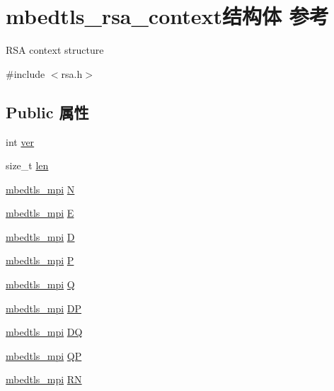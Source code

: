 \hypertarget{structmbedtls__rsa__context}{}\section{mbedtls\+\_\+rsa\+\_\+context结构体 参考}
\label{structmbedtls__rsa__context}


R\+SA context structure  




{\ttfamily \#include $<$rsa.\+h$>$}

\subsection*{Public 属性}
\begin{DoxyCompactItemize}
\item 
int \hyperlink{structmbedtls__rsa__context_a3b8683697a6f69c92860e078c934a4d9}{ver}
\item 
size\+\_\+t \hyperlink{structmbedtls__rsa__context_a06a537fe6045d6c08d92b2a91461b5d8}{len}
\item 
\hyperlink{structmbedtls__mpi}{mbedtls\+\_\+mpi} \hyperlink{structmbedtls__rsa__context_a359cae81bccf5cfd2f37f98d1b790707}{N}
\item 
\hyperlink{structmbedtls__mpi}{mbedtls\+\_\+mpi} \hyperlink{structmbedtls__rsa__context_a7694251c9d4d80f4fe65831be46b0c50}{E}
\item 
\hyperlink{structmbedtls__mpi}{mbedtls\+\_\+mpi} \hyperlink{structmbedtls__rsa__context_ad9552371239922dd67d146b937d1aada}{D}
\item 
\hyperlink{structmbedtls__mpi}{mbedtls\+\_\+mpi} \hyperlink{structmbedtls__rsa__context_abb8c0a5e2c22d617ff2fc3b2a81ab53c}{P}
\item 
\hyperlink{structmbedtls__mpi}{mbedtls\+\_\+mpi} \hyperlink{structmbedtls__rsa__context_a72efb64a1c63318ced5869e570c7cce3}{Q}
\item 
\hyperlink{structmbedtls__mpi}{mbedtls\+\_\+mpi} \hyperlink{structmbedtls__rsa__context_aa46b066a4cf04deb4e627e69e6b036e8}{DP}
\item 
\hyperlink{structmbedtls__mpi}{mbedtls\+\_\+mpi} \hyperlink{structmbedtls__rsa__context_a753b59e552469b6abb6fad9853a2042d}{DQ}
\item 
\hyperlink{structmbedtls__mpi}{mbedtls\+\_\+mpi} \hyperlink{structmbedtls__rsa__context_a76dad2612cdce4bc90933d317d3adc92}{QP}
\item 
\hyperlink{structmbedtls__mpi}{mbedtls\+\_\+mpi} \hyperlink{structmbedtls__rsa__context_a6e8530ea71b28336cbebd77219757271}{RN}

\end{DoxyCompactItemize}
